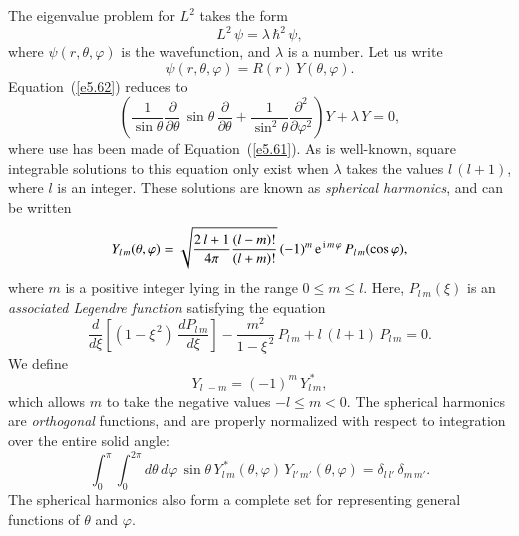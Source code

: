  The eigenvalue problem for
$L^2$ takes the form
\begin{equation}\label{e5.62}
L^2 \,\psi = \lambda \,\hbar^2\, \psi,
\end{equation}
where $\psi(r, \theta, \varphi)$ is the wavefunction, and $\lambda$ is a number. 
Let us write
\begin{equation}
\psi(r, \theta, \varphi) = R(r) \,Y(\theta, \varphi).
\end{equation}
Equation~(\ref{e5.62}) reduces to
\begin{equation}
\left( \frac{1}{\sin\theta}\frac{\partial}{\partial\theta}\,
\sin\theta\,\frac{\partial}{\partial\theta} + \frac{1}{\sin^2\theta}\frac{\partial^2}
{\partial\varphi^2}\right)Y + \lambda \,Y = 0,
\end{equation}
where use has been made of Equation~(\ref{e5.61}). As is well-known,
square integrable solutions to this
equation only exist when $\lambda$ takes the values $l\,(l+1)$, where $l$ is
an integer. These solutions are known as {\em spherical harmonics}, and
can be written
\begin{equation}\label{e5.65}
Y_{l\,m}(\theta, \varphi) = \sqrt{ \frac{2\,l+1}{4\pi} \frac{(l-m)!}{(l+m)!}}
\,(-1)^m\, {\rm e}^{\,{\rm i} \,m\,\varphi}\, P_{l\,m}(\cos\varphi),
\end{equation}
where $m$ is a positive  integer lying in the range $0\leq  m\leq l$. Here, 
$P_{l\,m}(\xi)$ is an {\em associated Legendre function}\/ satisfying the
equation
\begin{equation}
\frac{d}{d\xi}\! \left[ (1-\xi^{\,2})\,\frac{dP_{l\,m}}{d\xi}\right]
- \frac{m^2}{1-\xi^{\,2}}\, P_{l\,m} + l\,(l+1)\,P_{l\,m} = 0.
\end{equation}
We define 
\begin{equation}
Y_{l\,\,-m} = (-1)^m\, Y_{l\,m}^{\,\ast},
\end{equation}
which allows $m$ to take the negative values $-l\leq m< 0$.
The spherical harmonics are {\em orthogonal}\/ functions, and are 
properly normalized with respect to integration over
the entire solid angle:
\begin{equation}
\int_0^\pi \int_0^{2\pi}d\theta\,d\varphi \, \sin\theta\,Y_{l\,m}^{\,\ast} (\theta,\varphi)\,
Y_{l'\,m'}(\theta, \varphi) = \delta_{l \,l'} \,\delta_{m \,m'}.
\end{equation}
The spherical harmonics also form a complete set for representing general functions
of $\theta$ and $\varphi$. 

